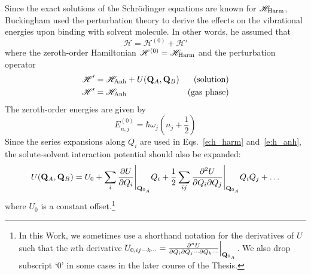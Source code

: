 \documentclass[a4paper,titlepage,twoside,fleqn,12pt]{book}
\begin{document}
\begin{refsection}
Since the exact solutions of the Schr{\"o}dinger equations are known 
for $\mathscr{H}_{\rm Harm}$, Buckingham used the perturbation theory
to derive the effects on the vibrational energies upon binding with solvent
molecule. %
In other words, he assumed that
%
\begin{equation} \label{e:RSPT-Hamiltonian}
\mathscr{H} = \mathscr{H}^{(0)} + \mathscr{H}'
\end{equation}
%
where the zeroth\hyp{}order Hamiltonian $\mathscr{H}^{(0)}=\mathscr{H}_{\rm Harm}$
and the perturbation operator 
%
\begin{subequations} \label{e:RSPT-Hamiltonian:perturbation}
\begin{align}
\mathscr{H}'&=\mathscr{H}_{\rm Anh} + U({\bf Q}_A,{\bf Q}_B)  & \text{(solution)}\\
\mathscr{H}'&=\mathscr{H}_{\rm Anh}                           & \text{(gas phase)}
\end{align}
\end{subequations}
%
The zeroth\hyp{}order energies are given by
%
\begin{equation}
E_{n,j}^{(0)} = \hbar \omega_j \left( n_j+\frac{1}{2} \right)
\end{equation}
%
Since the series expansions along $Q_i$ are used in Eqs.~\eqref{e:h_harm}
and~\eqref{e:h_anh}, the solute\hyp{}solvent interaction potential
should also be expanded:
%
\begin{equation}\label{e:u_taylor}
U({\bf Q}_A,{\bf Q}_B) = 
U_0 + \sum_i \frac{\partial U}{\partial Q_i} \Bigg|_{{\bf Q}_{0_A}} Q_i
+ \frac{1}{2} \sum_{ij} \frac{\partial^2 U}{\partial Q_i \partial Q_j} \Bigg|_{{\bf Q}_{0_A}} Q_i Q_j
+ \ldots
\end{equation}
%
where $U_0$ is a constant offset.\footnote{
%
In this Work, we sometimes use a shorthand notation for the derivatives
of $U$ such that the $n$th derivative $U_{0,ij\cdots k\cdots}
= \frac{\partial^n U}{\partial Q_i\partial Q_j \cdots \partial Q_k \cdots} \Big|_{{\bf Q}_{0_A}}
$. We also drop subscript `0' in some cases in the later course of the Thesis. 
%
} 


\end{refsection}
\end{document}

